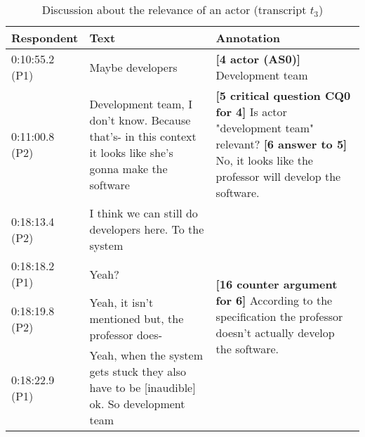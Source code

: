 \begin{table}[!htbp]
\centering
\begin{tabular}{|p{20mm}|p{70mm}|p{60mm}|}
\hline
Respondent & Text & Annotation\\
\hline
0:10:55.2 (P1) & Maybe developers &\textbf{[4 actor (AS0)]} Development team\\
\hline
0:11:00.8 (P2) & Development team, I don't know. Because that's- in this context it looks like she's gonna make the software & \textbf{[5 critical question CQ0 for 4]} Is actor "development team" relevant?\newline
\textbf{[6 answer to 5]} No, it looks like the professor will develop the software.\\
\hline
0:18:13.4 (P2) & I think we can still do developers here. To the system & \multirow{4}{60mm}{\textbf{[16 counter argument for 6]} According to the specification the professor doesn't actually develop the software.}\\
\cline{1-2}
0:18:18.2 (P1)  & Yeah?&\\
\cline{1-2}
0:18:19.8 (P2) & Yeah, it isn't mentioned but, the professor does-&\\
\cline{1-2}
0:18:22.9 (P1) & Yeah, when the system gets stuck they also have to be [inaudible] ok. So development team&\\	
\hline
\end{tabular}
\caption{Discussion about the relevance of an actor (transcript $t_3$)}
\label{table:transcript:irrelevant-actor}
\end{table}

